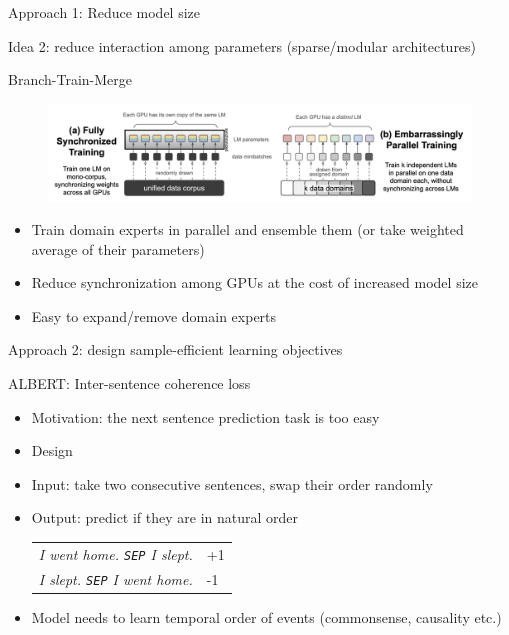 \documentclass[usenames,dvipsnames,notes,11pt,aspectratio=169,hyperref={colorlinks=true, linkcolor=blue}]{beamer}
\begin{document}
\begin{frame}
    {Approach 1: Reduce model size}

    Idea 2: reduce interaction among parameters (sparse/modular architectures)

    Branch-Train-Merge 
    \begin{figure}
            \includegraphics[width=\textwidth]{figures/btm}
    \end{figure}
    \begin{itemize}
        \item Train domain experts in parallel and ensemble them (or take weighted average of their parameters)
        \item Reduce synchronization among GPUs at the cost of increased model size
        \item Easy to expand/remove domain experts 
    \end{itemize}
\end{frame}

\begin{frame}
    {Approach 2: design sample-efficient learning objectives}

    ALBERT: Inter-sentence coherence loss\\
    \begin{itemize}
        \item Motivation: the next sentence prediction task is too easy
        \item Design 
        \item Input: take two consecutive sentences, swap their order randomly
        \item Output: predict if they are in natural order\\
            \begin{tabular}{ll}
                \textit{I went home. \texttt{SEP} I slept.} & +1\\
                \textit{I slept. \texttt{SEP} I went home.} & -1\\
            \end{tabular}
            
        \item Model needs to learn temporal order of events (commonsense, causality etc.) 
    \end{itemize}
\end{frame}
\end{document}
